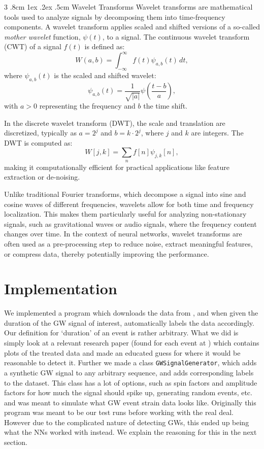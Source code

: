 \documentclass[%
reprint,
amsmath,amssymb,
aps,
]{revtex4-2}
\makeatletter
\renewcommand{\subsubsection}{%
	\@startsection
	{subsubsection}%
	{3}%
	{\z@}%
	{.8cm \@plus1ex \@minus .2ex}%
	{.5cm}%
	{\normalfont\small\centering}%
}
\makeatother
\begin{document}
\subsubsection{Wavelet Transforms}
Wavelet transforms are mathematical tools used to analyze signals by decomposing them into time-frequency components. A wavelet transform applies scaled and shifted versions of a so-called \textit{mother wavelet} function, $\psi(t)$, to a signal. The continuous wavelet transform (CWT) of a signal $f(t)$ is defined as:
\[W(a,b)=\int_{-\infty}^{\infty}f(t)\psi_{a,b}(t)\,dt,\]
where $\psi_{a,b}(t)$ is the scaled and shifted wavelet:
\[\psi_{a,b}(t)=\frac{1}{\sqrt{|a|}}\psi\left(\frac{t-b}{a}\right),\]
with $a>0$ representing the frequency and $b$ the time shift.  

In the discrete wavelet transform (DWT), the scale and translation are discretized, typically as $a=2^j$ and $b=k\cdot2^j$, where $j$ and $k$ are integers. The DWT is computed as:
\[W[j,k]=\sum_{n}f[n]\psi_{j,k}[n],\]
making it computationally efficient for practical applications like feature extraction or de-noising. 

Unlike traditional Fourier transforms, which decompose a signal into sine and cosine waves of different frequencies, wavelets allow for both time and frequency localization. This makes them particularly useful for analyzing non-stationary signals, such as gravitational waves or audio signals, where the frequency content changes over time. In the context of neural networks, wavelet transforms are often used as a pre-processing step to reduce noise, extract meaningful features, or compress data, thereby potentially improving the performance.

\section{Implementation}
\label{sec:implementation}
We implemented a program which downloads the data from \cite{gwosc}, and when given the duration of the GW signal of interest, automatically labels the data accordingly. Our definition for `duration' of an event is rather arbitrary. What we did is simply look at a relevant research paper (found for each event at \cite{gwosc_all_events}) which contains plots of the treated data and made an educated guess for where it would be reasonable to detect it. Further we made a class \texttt{GWSignalGenerator}, which adds a synthetic GW signal to any arbitrary sequence, and adds corresponding labels to the dataset. This class has a lot of options, such as spin factors and amplitude factors for how much the signal should spike up, generating random events, etc. and was meant to simulate what GW event strain data looks like. Originally this program was meant to be our test runs before working with the real deal. However due to the complicated nature of detecting GWs, this ended up being what the NNs worked with instead. We explain the reasoning for this in the next section.
\end{document}
